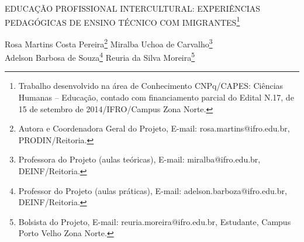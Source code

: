 \documentclass[article,12pt,onesidea,4paper,english,brazil]{abntex2}
\begin{document}
	
	
	\frenchspacing 
	
	\begin{center}
		\LARGE EDUCAÇÃO PROFISSIONAL INTERCULTURAL: EXPERIÊNCIAS PEDAGÓGICAS DE ENSINO TÉCNICO COM  IMIGRANTES\footnote{Trabalho desenvolvido na área de Conhecimento CNPq/CAPES: Ciências Humanas – Educação, contado com financiamento parcial do Edital N.17, de 15 de setembro de 2014/IFRO/Campus Zona Norte.}
		
		\normalsize
		Rosa Martins Costa Pereira\footnote{Autora e Coordenadora Geral do Projeto, E-mail: rosa.martins@ifro.edu.br, PRODIN/Reitoria.} 
	    Miralba Uchoa de Carvalho\footnote{Professora do Projeto (aulas teóricas), E-mail: miralba@ifro.edu.br, DEINF/Reitoria.} \\
		Adelson Barbosa de Souza\footnote{Professor do Projeto (aulas práticas), E-mail: adelson.barboza@ifro.edu.br, DEINF/Reitoria.} 
		Reuria da Silva Moreira\footnote{Bolsista do Projeto, E-mail: reuria.moreira@ifro.edu.br, Estudante, Campus Porto Velho Zona Norte. } 
	\end{center}
	
\end{document}
